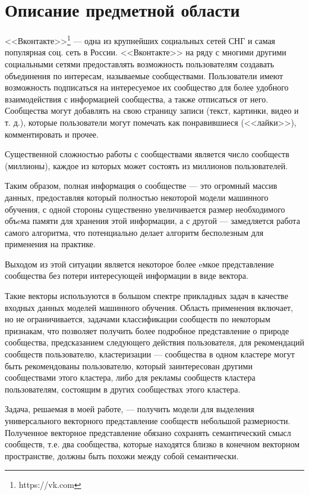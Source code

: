 \documentclass[times,specification,annotation]{itmo-student-thesis}
\begin{document}
\chapter{Описание предметной области}

<<Вконтакте>>\footnote{https://vk.com} --- одна из крупнейших социальных сетей СНГ и самая
популярная соц. сеть в России. <<Вконтакте>> на ряду с многими другими
социальными сетями предоставлять возможность пользователям создавать объединения по интересам,
называемые сообществами. Пользователи имеют возможность подписаться на
интересуемое их сообщество для более удобного взаимодействия с информацией
сообщества, а также отписаться от него. Сообщества могут добавлять на свою
страницу записи (текст, картинки, видео и т. д.), которые пользователи могут
помечать как понравившиеся (<<лайки>>), комментировать и прочее.

Существенной сложностью работы с сообществами является число сообществ (миллионы), каждое из которых может состоять из миллионов пользователей.  

Таким образом, полная информация о сообществе --- это огромный массив
данных, предоставляя который полностью некоторой модели машинного обучения,
с одной стороны существенно увеличивается размер необходимого объeма памяти для хранения этой информации, а с другой --- замедляется работа самого алгоритма, что потенциально делает алгоритм бесполезным для применения на практике.

Выходом из этой ситуации является некоторое более eмкое представление сообщества без потери интересующей информации в виде вектора.

Такие векторы используются в большом спектре прикладных задач в качестве входных данных моделей машинного обучения. Область применения включает, но не ограничивается, задачами классификации сообществ по некоторым признакам, что позволяет получить более подробное представление о природе сообщества, предсказанием следующего действия пользователя, для рекомендаций сообществ пользователю, кластеризации --- сообщества в одном кластере могут быть рекомендованы пользователю, который заинтересован другими сообществами этого кластера, либо для рекламы сообществ кластера пользователям, состоящим в других сообществах этого кластера. 

Задача, решаемая в моей работе, --- получить модели для выделения универсального векторного представление сообществ небольшой размерности. Полученное векторное представление обязано сохранять семантический смысл сообществ, т.е. два сообщества, которые находятся близко в конечном векторном пространстве, должны быть похожи между собой семантически. 
\end{document}
